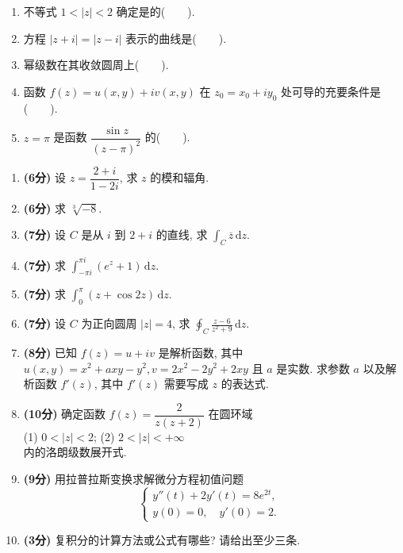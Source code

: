 \documentclass[simple]{hfutexam}
\newcommand{\diff}{\,\mathrm{d}}
\begin{document}
\begin{enumerate}
  \item 不等式 $1<|z|<2$ 确定是的(~~~~).
  \item 方程 $|z+i|=|z-i|$ 表示的曲线是(~~~~).
  \item 幂级数在其收敛圆周上(~~~~).
  \item 函数 $f(z)=u(x,y)+iv(x,y)$ 在 $z_0=x_0+iy_0$ 处可导的充要条件是(~~~~).
  \item $z=\pi$ 是函数 $\dfrac{\sin z}{(z-\pi)^2}$ 的(~~~~).
\end{enumerate}

\begin{enumerate}
\item \textbf{(6分)} 设 $z=\dfrac{2+i}{1-2i}$, 求 $z$ 的模和辐角.
\item \textbf{(6分)} 求 $\sqrt[3]{-8}$.
\item \textbf{(7分)} 设 $C$ 是从 $i$ 到 $2+i$ 的直线, 求 $\displaystyle\int_C \overline z\diff z$.
\item \textbf{(7分)} 求 $\displaystyle\int_{-\pi i}^{\pi i}(e^z+1)\diff z$.
\item \textbf{(7分)} 求 $\displaystyle\int_0^\pi (z+\cos 2z)\diff z$.
\item \textbf{(7分)} 设 $C$ 为正向圆周 $|z|=4$, 求 $\displaystyle\oint_C\frac{z-6}{z^2+9}\diff z$.
\item \textbf{(8分)} 已知 $f(z)=u+iv$ 是解析函数, 其中 $u(x,y)=x^2+axy-y^2, v=2x^2-2y^2+2xy$ 且 $a$ 是实数.
求参数 $a$ 以及解析函数 $f'(z)$, 其中 $f'(z)$ 需要写成 $z$ 的表达式.
\item \textbf{(10分)} 确定函数 $f(z)=\dfrac{2}{z(z+2)}$ 在圆环域\\
\indent (1) $0<|z|<2$; \hspace{2em} (2) $2<|z|<+\infty$\\
内的洛朗级数展开式.
\item \textbf{(9分)} 用拉普拉斯变换求解微分方程初值问题
\[\begin{cases}
y''(t)+2y'(t)=8e^{2t},&\\
y(0)=0,\quad y'(0)=2.
\end{cases}\]
\item \textbf{(3分)} 复积分的计算方法或公式有哪些? 请给出至少三条.
\end{enumerate}
\end{document}
